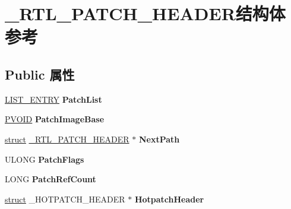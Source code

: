 \hypertarget{struct___r_t_l___p_a_t_c_h___h_e_a_d_e_r}{}\section{\+\_\+\+R\+T\+L\+\_\+\+P\+A\+T\+C\+H\+\_\+\+H\+E\+A\+D\+E\+R结构体 参考}
\label{struct___r_t_l___p_a_t_c_h___h_e_a_d_e_r}
\subsection*{Public 属性}
\begin{DoxyCompactItemize}
\item 
\mbox{\label{struct___r_t_l___p_a_t_c_h___h_e_a_d_e_r_ad77f368e6be32806f3c691d534801635}} 
\hyperlink{struct___l_i_s_t___e_n_t_r_y}{L\+I\+S\+T\+\_\+\+E\+N\+T\+RY} {\bfseries Patch\+List}
\item 
\mbox{\label{struct___r_t_l___p_a_t_c_h___h_e_a_d_e_r_a82e34f023fb4d0c69db7deee7b75d7df}} 
\hyperlink{interfacevoid}{P\+V\+O\+ID} {\bfseries Patch\+Image\+Base}
\item 
\mbox{\label{struct___r_t_l___p_a_t_c_h___h_e_a_d_e_r_a464ed0a9065855f804085ea1297f095d}} 
\hyperlink{interfacestruct}{struct} \hyperlink{struct___r_t_l___p_a_t_c_h___h_e_a_d_e_r}{\+\_\+\+R\+T\+L\+\_\+\+P\+A\+T\+C\+H\+\_\+\+H\+E\+A\+D\+ER} $\ast$ {\bfseries Next\+Path}
\item 
\mbox{\label{struct___r_t_l___p_a_t_c_h___h_e_a_d_e_r_a7079d5f987b79d32ee278407de85a5d2}} 
U\+L\+O\+NG {\bfseries Patch\+Flags}
\item 
\mbox{\label{struct___r_t_l___p_a_t_c_h___h_e_a_d_e_r_a3be1de927896815c32d9d21b282edd7e}} 
L\+O\+NG {\bfseries Patch\+Ref\+Count}
\item 
\mbox{\label{struct___r_t_l___p_a_t_c_h___h_e_a_d_e_r_a1bd369a62a5f28f8a062db9aa596976c}} 
\hyperlink{interfacestruct}{struct} \+\_\+\+H\+O\+T\+P\+A\+T\+C\+H\+\_\+\+H\+E\+A\+D\+ER $\ast$ {\bfseries Hotpatch\+Header}

\end{DoxyCompactItemize}
